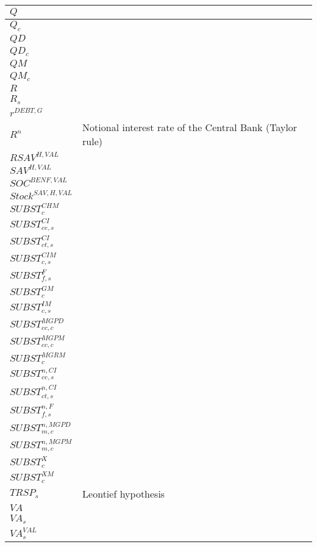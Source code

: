\documentclass[12pt]{article}
\numberwithin{equation}{section}
\begin{document}
\begin{longtable}{@{}p{4cm}p{9cm}@{}}
 \midrule 
$Q$ &  \\
 \midrule 
$Q_{c}$ &  \\
 \midrule 
$QD$ &  \\
 \midrule 
$QD_{c}$ &  \\
 \midrule 
$QM$ &  \\
 \midrule 
$QM_{c}$ &  \\
 \midrule 
$R$ &  \\
 \midrule 
$R_{s}$ &  \\
 \midrule 
$r^{DEBT,G}$ &  \\
 \midrule 
$R^{n}$ & Notional interest rate of the Central Bank (Taylor rule) \\
 \midrule 
$RSAV^{H,VAL}$ &  \\
 \midrule 
$SAV^{H,VAL}$ &  \\
 \midrule 
$SOC^{BENF,VAL}$ &  \\
 \midrule 
$Stock^{SAV,H,VAL}$ &  \\
 \midrule 
$SUBST^{CHM}_{c}$ &  \\
 \midrule 
$SUBST^{CI}_{ce, s}$ &  \\
 \midrule 
$SUBST^{CI}_{ct, s}$ &  \\
 \midrule 
$SUBST^{CIM}_{c, s}$ &  \\
 \midrule 
$SUBST^{F}_{f, s}$ &  \\
 \midrule 
$SUBST^{GM}_{c}$ &  \\
 \midrule 
$SUBST^{IM}_{c, s}$ &  \\
 \midrule 
$SUBST^{MGPD}_{cc, c}$ &  \\
 \midrule 
$SUBST^{MGPM}_{cc, c}$ &  \\
 \midrule 
$SUBST^{MGRM}_{c}$ &  \\
 \midrule 
$SUBST^{n,CI}_{ce, s}$ &  \\
 \midrule 
$SUBST^{n,CI}_{ct, s}$ &  \\
 \midrule 
$SUBST^{n,F}_{f, s}$ &  \\
 \midrule 
$SUBST^{n,MGPD}_{m, c}$ &  \\
 \midrule 
$SUBST^{n,MGPM}_{m, c}$ &  \\
 \midrule 
$SUBST^{X}_{c}$ &  \\
 \midrule 
$SUBST^{XM}_{c}$ &  \\
 \midrule 
$TRSP_{s}$ & Leontief hypothesis \\
 \midrule 
$VA$ &  \\
 \midrule 
$VA_{s}$ &  \\
 \midrule 
$VA^{VAL}_{s}$ &  \\
 \midrule 

\end{longtable}
\end{document}
